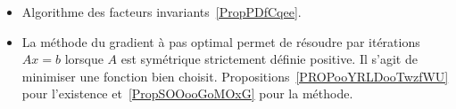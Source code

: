 
\begin{itemize}
    \item Algorithme des facteurs invariants~\ref{PropPDfCqee}.
    \item La méthode du gradient à pas optimal permet de résoudre par itérations \( Ax=b\) lorsque \( A\) est symétrique strictement définie positive. Il s'agit de minimiser une fonction bien choisit. Propositions~\ref{PROPooYRLDooTwzfWU} pour l'existence et~\ref{PropSOOooGoMOxG} pour la méthode.
\end{itemize}
